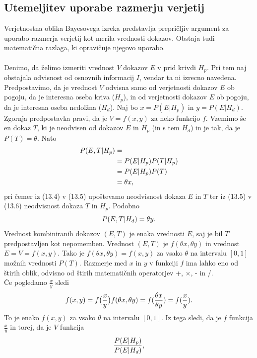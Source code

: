 \documentclass[fin1, tisk]{fmfdelo}
\theoremstyle{definition}
\theoremstyle{trditev}
\theoremstyle{izrek}
\begin{document}
\subsection{Utemeljitev uporabe razmerju verjetij}
Verjetnostna oblika Bayesovega izreka predstavlja prepričljiv argument za uporabo razmerja verjetij kot merila vrednosti dokazov.
Obstaja tudi matematična razlaga, ki opravičuje njegovo uporabo.\\\\
Denimo, da želimo izmeriti vrednost $V$ dokazov $E$ v prid krivdi $H_p$. Pri tem naj obstajala odvisnost od osnovnih informacij $I$, vendar ta ni izrecno
navedena. Predpostavimo, da je vrednost $V$ odvisna samo od verjetnosti dokazov $E$ ob pogoju, da je interesna oseba kriva ($H_p$), in od verjetnosti dokazov $E$ ob pogoju,
da je interesna oseba nedolžna ($H_d$). Naj bo $x=P(E \lvert H_p)$ in $y=P(E \lvert H_d)$. Zgornja predpostavka pravi, da je $V = f (x, y)$ za neko funkcijo $f$.
Vzemimo še en dokaz $T$, ki je neodvisen od dokazov $E$ in $H_p$ (in s tem $H_d$) in je tak, da je $P(T) = \theta$. Nato
\begin{align}
   P(E,T \lvert H_p) & = \\
   & = P(E \lvert H_p)P(T \lvert H_p) \\
   & = P(E \lvert H_p)P(T)\\
   & = \theta x, \vspace{2mm}
\end{align}
pri čemer iz (13.4) v (13.5) upoštevamo neodvisnost dokaza $E$ in $T$ ter iz (13.5) v (13.6) neodvisnost dokaza $T$ in $H_p$. Podobno
\[
   P(E,T \lvert H_d)  = \theta y. \vspace{2mm}
\]
Vrednost kombiniranih dokazov $(E, T)$ je enaka vrednosti $E$, saj je bil $T$ predpostavljen kot nepomemben. Vrednost $(E, T)$ je $f(\theta x, \theta y)$ in 
vrednost $E = V = f (x, y)$. Tako je $f(\theta x, \theta y) = f(x,y)$ za vsako $\theta$ na intervalu $[0,1]$ možnih vrednosti $P(T)$. Razmerje med
$x$ in $y$ v funkciji $f$ ima lahko eno od štirih oblik, odvisno od štirih matematičnih operatorjev +, ×, - in /. \\
 Če pogledamo $\frac{x}{y}$ sledi
\[
   f(x,y) = f \big(\frac{x}{y}\big)
   f(\theta x, \theta y) = f(\frac{\theta x}{\theta y}) = f(\frac{x}{y}). \vspace{2mm}
\]
To je enako $f(x,y)$ za vsako $\theta$ na intervalu $[0,1]$. Iz tega sledi, da je $f$ funkcija $\frac{x}{y}$ in torej, da je $V$ funkcija
\[
   \frac{P(E \lvert H_p)}{P(E \lvert H_d)}, \vspace{2mm}
\]
\end{document}
